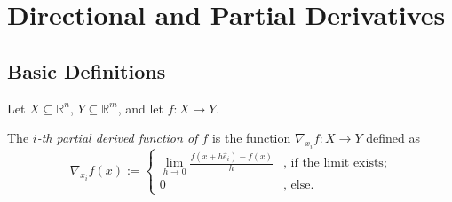 \chapter{Directional and Partial Derivatives}



\section{Basic Definitions}


\begin{definition}
	Let $X \subseteq \mathbb R^n$, $Y \subseteq \mathbb R^m$, and let $f: X \to Y$.
	
	The \textit{$i$-th partial derived function of $f$} is the function $\nabla_{x_i} f : X \to Y$ defined as
	$$
	\nabla_{x_i} f(x) :=
	\begin{cases}
		\displaystyle \lim_{h \to 0} \frac{ f(x + h \hat e_i) - f(x) }{h} & \text{, if the limit exists;} \\
		0 & \text{, else.}
	\end{cases}
	$$
\end{definition}
































